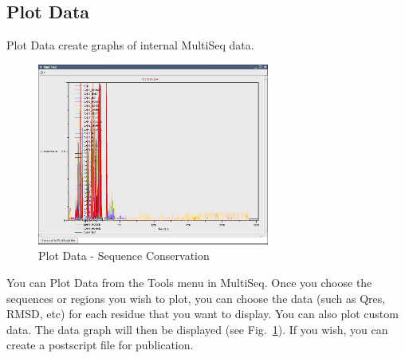 

\subsection{Plot Data}
\textsf{Plot Data} 
create graphs of internal MultiSeq data.
\begin{figure}[here]
 \centerline{\includegraphics [width=3in]{./pictures/multiPlot.jpg}}
 \caption{Plot Data - Sequence Conservation}
\label{fig:plotData}
\end{figure}
You can \textsf{Plot Data} from the \textsf{Tools} menu in MultiSeq.
Once you choose the sequences or regions you wish to plot, you can
choose the data (such as \textsf{Qres}, \textsf{RMSD}, etc) for each
residue that you want to display.  You can also plot custom data.  The
data graph will then be displayed (see Fig.~\ref{fig:plotData}).  If you
wish, you can create a postscript file for publication.

